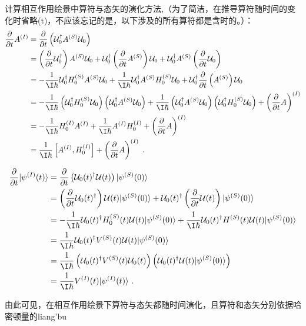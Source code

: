 计算相互作用绘景中算符与态矢的演化方法,（为了简洁，在推导算符随时间的变化时省略(t)，不应该忘记的是，以下涉及的所有算符都是含时的。）：
\begin{align}
\frac{\partial}{\partial t}A^{(I)}&=\frac{\partial}{\partial t}\left(\mathcal U_0^\dagger A^{(S)}\mathcal U_0 \right)\\
&=\left(\frac{\partial}{\partial t}\mathcal U_0^\dagger\right) A^{(S)}\mathcal U_0 +\mathcal U_0^\dagger \left(\frac{\partial}{\partial t}A^{(S)}\right)\mathcal U_0+\mathcal U_0^\dagger A^{(S)}\left(\frac{\partial}{\partial t}\mathcal U_0\right)\\
&=-\frac{1}{\I\hbar}\mathcal U_0^\dagger H^{(S)}_0A^{(S)}\mathcal U_0 +\frac{1}{\I\hbar}\mathcal U_0^\dagger A^{(S)}H^{(S)}_0\mathcal U_0+\mathcal U_0^\dagger \frac{\partial}{\partial t}\left(A^{(S)}\right)\mathcal U_0 \\
&=-\frac{1}{\I\hbar}\left(\mathcal U_0^\dagger H^{(S)}_0 \mathcal U_0\right)\left(\mathcal U_0^\dagger A^{(S)}\mathcal U_0\right) +\frac{1}{\I\hbar}\left(\mathcal U_0^\dagger A^{(S)}\mathcal U_0\right)\left(\mathcal U_0^\dagger H^{(S)}_0\mathcal U_0\right)+\left(\frac{\partial}{\partial t}A\right)^{(I)} \\
&=-\frac{1}{\I\hbar} H^{(I)}_0  A^{(I)}+\frac{1}{\I\hbar} A^{(I)} H^{(I)}_0+\left(\frac{\partial}{\partial t}A\right)^{(I)} \\
&=\frac{1}{\I\hbar}\left[A^{(I)},H_0^{(I)}\right]+\left(\frac{\partial}{\partial t}A\right)^{(I)}~.
\end{align}

\begin{align}
\frac{\partial}{\partial t}|\psi^{(I)}(t)\rangle&=
\frac{\partial}{\partial t}\left(\mathcal U_0(t)^\dagger\mathcal U(t)\right)|\psi^{(S)}(0)\rangle \\
&=\left(\frac{\partial}{\partial t}\mathcal U_0(t)^\dagger\right)\mathcal U(t)|\psi^{(S)}(0)\rangle+\mathcal U_0(t)^\dagger\left(\frac{\partial}{\partial t}\mathcal U(t)\right)|\psi^{(S)}(0)\rangle \\
&=-\frac{1}{\I\hbar}\mathcal U_0(t)^\dagger H^{(S)}_0(t)\mathcal U(t)|\psi^{(S)}(0)\rangle+\frac{1}{\I\hbar}\mathcal U_0(t)^\dagger H^{(S)}(t)\mathcal U(t) |\psi^{(S)}(0)\rangle \\
&=\frac{1}{\I\hbar}\mathcal U_0(t)^\dagger V^{(S)}(t)\mathcal U(t) |\psi^{(S)}(0)\rangle \\
&=\frac{1}{\I\hbar}\left(\mathcal U_0(t)^\dagger V^{(S)}(t)\mathcal U_0(t)\right)\left(\mathcal U_0(t)^\dagger\mathcal U(t) |\psi^{(S)}(0)\rangle\right) \\
&=\frac{1}{\I\hbar}V^{(I)}(t)|\psi^{(I)}(t)\rangle~.
\end{align}

由此可见，在相互作用绘景下算符与态矢都随时间演化，且算符和态矢分别依据哈密顿量的liang'bu


